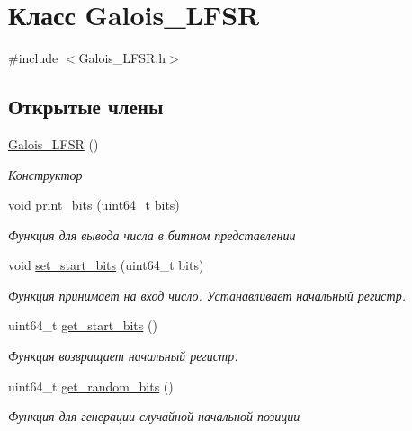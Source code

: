 \hypertarget{classGalois__LFSR}{}\section{Класс Galois\+\_\+\+L\+F\+SR}
\label{classGalois__LFSR}


{\ttfamily \#include $<$Galois\+\_\+\+L\+F\+S\+R.\+h$>$}

\subsection*{Открытые члены}
\begin{DoxyCompactItemize}
\item 
\mbox{\label{classGalois__LFSR_a23455fca80e4ed521062a7b2842edb03}} 
\hyperlink{classGalois__LFSR_a23455fca80e4ed521062a7b2842edb03}{Galois\+\_\+\+L\+F\+SR} ()
\begin{DoxyCompactList}\small\item\em Конструктор \end{DoxyCompactList}\item 
void \hyperlink{classGalois__LFSR_a7a2d2fa3f9f7973cb520d92267f58f4d}{print\+\_\+bits} (uint64\+\_\+t bits)
\begin{DoxyCompactList}\small\item\em Функция для вывода числа в битном представлении \end{DoxyCompactList}\item 
void \hyperlink{classGalois__LFSR_aa3a893992b929b01a649d859a121ae34}{set\+\_\+start\+\_\+bits} (uint64\+\_\+t bits)
\begin{DoxyCompactList}\small\item\em Функция принимает на вход число. Устанавливает начальный регистр. \end{DoxyCompactList}\item 
uint64\+\_\+t \hyperlink{classGalois__LFSR_aea6f1eea9ba930bb7419426a45a59c5c}{get\+\_\+start\+\_\+bits} ()
\begin{DoxyCompactList}\small\item\em Функция возвращает начальный регистр. \end{DoxyCompactList}\item 
uint64\+\_\+t \hyperlink{classGalois__LFSR_abc5cfd0aa22803188a1f81a5959f22eb}{get\+\_\+random\+\_\+bits} ()
\begin{DoxyCompactList}\small\item\em Функция для генерации случайной начальной позиции \end{DoxyCompactList}\item 

\end{DoxyCompactItemize}
